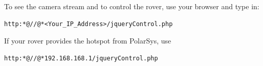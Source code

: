 To see the camera stream and to control the rover, use your browser and type in:
\begin{lstlisting}[label={lst:1}]
http:*@//@*<Your_IP_Address>/jqueryControl.php
\end{lstlisting}
If your rover provides the hotspot from PolarSys, use
\begin{lstlisting}[label={lst:partWrkflw}]
http:*@//@*192.168.168.1/jqueryControl.php
\end{lstlisting}
